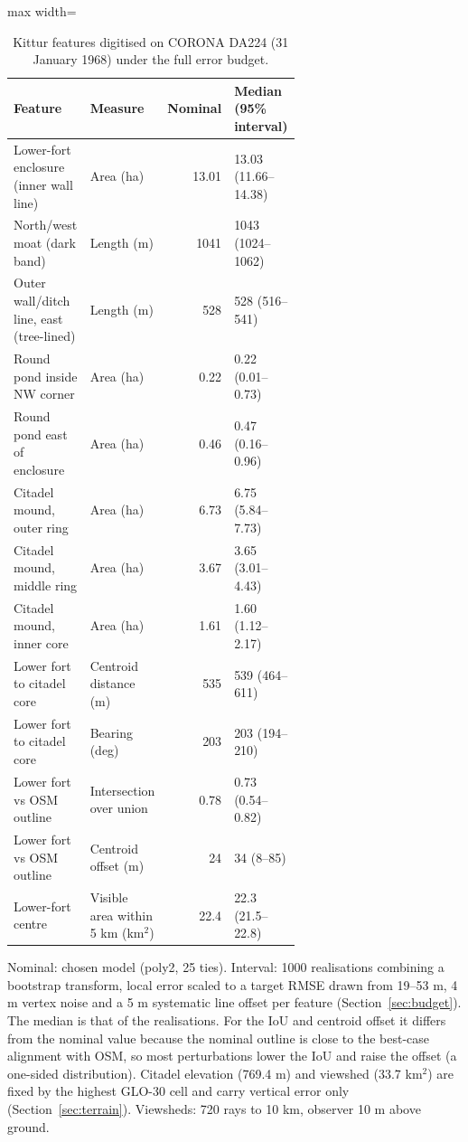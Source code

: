 \begin{table}[!htbp]
\centering
\footnotesize
\setlength{\tabcolsep}{4pt}
\caption{Kittur features digitised on CORONA DA224 (31 January 1968) under the full error budget.}
\label{tab:dimensions}
\begin{adjustbox}{max width=\linewidth}
\begin{tabular}{>{\raggedright\arraybackslash}p{0.36\linewidth}>{\raggedright\arraybackslash}p{0.27\linewidth}rl}
\toprule
Feature & Measure & Nominal & Median (95\% interval) \\
\midrule
Lower-fort enclosure (inner wall line) & Area (ha) & 13.01 & 13.03 (11.66--14.38) \\
North/west moat (dark band) & Length (m) & 1041 & 1043 (1024--1062) \\
Outer wall/ditch line, east (tree-lined) & Length (m) & 528 & 528 (516--541) \\
Round pond inside NW corner & Area (ha) & 0.22 & 0.22 (0.01--0.73) \\
Round pond east of enclosure & Area (ha) & 0.46 & 0.47 (0.16--0.96) \\
Citadel mound, outer ring & Area (ha) & 6.73 & 6.75 (5.84--7.73) \\
Citadel mound, middle ring & Area (ha) & 3.67 & 3.65 (3.01--4.43) \\
Citadel mound, inner core & Area (ha) & 1.61 & 1.60 (1.12--2.17) \\
Lower fort to citadel core & Centroid distance (m) & 535 & 539 (464--611) \\
Lower fort to citadel core & Bearing (deg) & 203 & 203 (194--210) \\
Lower fort vs OSM outline & Intersection over union & 0.78 & 0.73 (0.54--0.82) \\
Lower fort vs OSM outline & Centroid offset (m) & 24 & 34 (8--85) \\
Lower-fort centre & Visible area within 5 km (km$^2$) & 22.4 & 22.3 (21.5--22.8) \\
\bottomrule
\end{tabular}
\end{adjustbox}
\par\smallskip\parbox{\linewidth}{\scriptsize Nominal: chosen model (poly2, 25 ties). Interval: 1000 realisations combining a bootstrap transform, local error scaled to a target RMSE drawn from 19--53 m, 4 m vertex noise and a 5 m systematic line offset per feature (Section~\ref{sec:budget}). The median is that of the realisations. For the IoU and centroid offset it differs from the nominal value because the nominal outline is close to the best-case alignment with OSM, so most perturbations lower the IoU and raise the offset (a one-sided distribution). Citadel elevation (769.4 m) and viewshed (33.7 km$^2$) are fixed by the highest GLO-30 cell and carry vertical error only (Section~\ref{sec:terrain}). Viewsheds: 720 rays to 10 km, observer 10 m above ground.}
\end{table}
